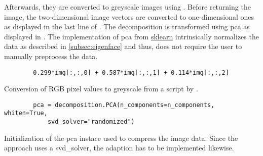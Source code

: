 Afterwards, they are converted to greyscale images using .
Before returning the image, the two-dimensional image vectors are converted to one-dimensional ones as displayed in the last line of .
The decomposition is transformed using \ac{pca} as displayed in .
The implementation of \ac{pca} from \href{https://scikit-learn.org/stable/modules/generated/sklearn.decomposition.PCA.html}{sklearn} 
intrinsically normalizes the data as described in \autoref{subsec:eigenface} and thus, does not require the user to manually preprocess the data.


\begin{listing}[htp]
    \begin{verbatim}
        0.299*img[:,:,0] + 0.587*img[:,:,1] + 0.114*img[:,:,2]
    \end{verbatim}
    \caption[Conversion of RGB pixel values to greyscale]{Conversion of RGB pixel values to greyscale from a script by \thesissupervisor{}.}
    \label{lst:rgb2grey}
\end{listing}

\begin{listing}[htp]
    \begin{verbatim}
        pca = decomposition.PCA(n_components=n_components, whiten=True, 
            svd_solver="randomized")
    \end{verbatim}
    \caption[Initialization of the \ac{pca} instace]{Initialization of the \ac{pca} instace used to compress the image data.
    Since the \eigenfaces{} approach uses a svd\_solver, the adaption \eigendocs{} has to be implemented likewise.
    }
    \label{lst:pca_svd}
\end{listing}


